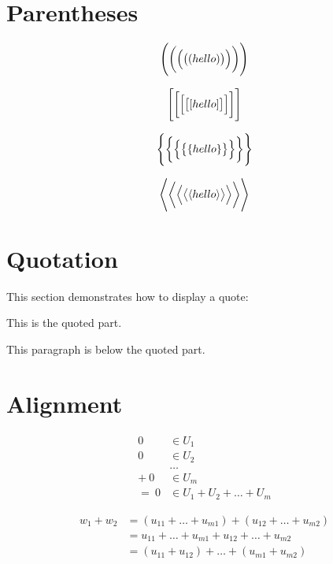 \documentclass[12pt, letterpaper, oneside]{article}
\begin{document}
\section{Parentheses}

\[\Biggl(\biggl(\Bigl(\bigl((hello)\bigr)\Bigr)\biggr)\Biggr)\]

\[\Biggl[\biggl[\Bigl[\bigl[[hello]\bigr]\Bigr]\biggr]\Biggr]\]

\[\Biggl\{\biggl\{\Bigl\{\bigl\{\{hello\}\bigr\}\Bigr\}\biggr\}\Biggr\}\]

\[
  \Biggl \langle \biggl \langle \Bigl \langle \bigl \langle
    \langle
      hello
    \rangle
  \bigr \rangle \Bigr \rangle \biggr \rangle \Biggr \rangle
\]

\section{Quotation}

This section demonstrates how to display a quote:

\begin{displayquote}
  This is the quoted part.
\end{displayquote}

This paragraph is below the quoted part.

\section{Alignment}

\begin{align*}
  0 & \in U_1 \\
  0 & \in U_2 \\
    & \ldots \\
+ \ 0 & \in U_m \\
= \ 0 & \in U_1 + U_2 + \ldots + U_m
\end{align*}

\begin{align*}
  w_1 + w_2 & = (u_{11} + \ldots + u_{m1}) + (u_{12} + \ldots + u_{m2}) \\
            & = u_{11} + \ldots + u_{m1} + u_{12} + \ldots + u_{m2} \\
            & = (u_{11} + u_{12}) + \ldots + (u_{m1} + u_{m2})
\end{align*}
\end{document}
